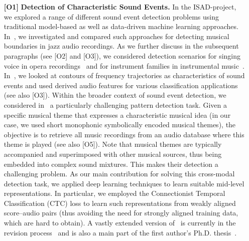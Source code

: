 \documentclass[11pt,a4paper]{article}
\def\PN{\mathrm{ISAD}}
\newenvironment{itemizePacked}{
\begin{itemize}
  \setlength{\itemsep}{1pt}
  \setlength{\parskip}{0pt}
  \setlength{\parsep}{0pt}
  \renewcommand{\labelitemi}{$\bullet$}
}{\end{itemize}}
\theoremstyle{plain} \newtheorem{define}{Definition}[section]
\begin{document}
\begin{enumerate}
\item [\textbf{[O1]}] \textbf{Detection of Characteristic Sound Events.}
%
%
%
%
In the $\PN$-project, we explored a range of different sound event detection problems using traditional model-based as well as data-driven machine learning approaches. In~\cite{Reck19_StructureBoundary_MasterThesis}, we investigated and compared such approaches for detecting musical boundaries in jazz audio recordings. As we further discuss in the subsequent paragraphs (see [O2] and [O3]), we considered detection scenarios for singing voice in opera recordings~\cite{KrauseMW21_OperaSingingActivity_Electronics,MimilakisWAAM19_SingingVDetWagner_MML} and for instrument families in instrumental music~\cite{TaenzerAMWLM19_InstrumentReco_ISMIR}. In~\cite{AbesserMueller19_ContourClassification_ICASSP}, we looked at contours of frequency trajectories as characteristics of sound events and used derived audio features for various classification applications (see also [O3]).
%
Within the broader context of sound event detection, we considered in~\cite{ZalkowM20_WeaklyAlignedTrain_ISMIR} a particularly challenging pattern detection task. Given a specific musical theme that expresses a characteristic musical idea (in our case, we used short monophonic symbolically encoded musical themes), the objective is to retrieve all music recordings from an audio database where this theme is played (see also [O5]). Note that musical themes are typically accompanied and superimposed with other musical sources, thus being embedded into complex sound mixtures. This makes their detection a challenging problem.
%
As our main contribution for solving this cross-modal detection task, we applied deep learning techniques to learn suitable mid-level representations. In particular, we employed the Connectionist Temporal Classification (CTC) loss to learn such representations from weakly aligned score--audio pairs (thus avoiding the need for strongly aligned training data, which are hard to obtain).  
%
%
A vastly extended version of~\cite{ZalkowM20_WeaklyAlignedTrain_ISMIR} is currently in the revision process~\cite{ZalkowM21_CTC-Chroma_TASLP} and is also a main part of the first author's Ph.D. thesis~\cite{Zalkow21_LearningAudioRep_PhD}.


\end{enumerate}
\end{document}
